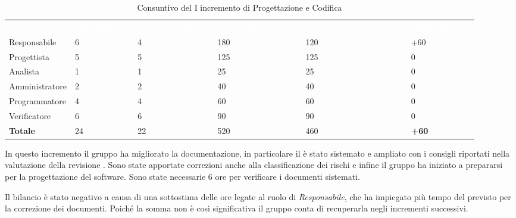 \begin{table}[H]
\begin{center}
\renewcommand{\arraystretch}{1.5}
\begin{tabular}{ m{}<{\centering}  m{}<{\centering} m{}<{\centering} m{}<{\centering} m{}<{\centering} m{}<{\centering}}	\rowcolor{darkblue}
	\textcolor{white}{\textbf{Ruolo}} & \textcolor{white}{\textbf{Ore Effettive}} & \textcolor{white}{\textbf{Ore Preventivate}}&\textcolor{white}{\textbf{Costo Effettivo (\euro)}}&\textcolor{white}{\textbf{Costo Preventivato (\euro)}}&\textcolor{white}{\textbf{Differenza (\euro)}}\\ 

	Responsabile  & 6 & 4 & 180 & 120 & +60\\	
	
	Progettista & 5 & 5 & 125 & 125 & 0\\
	
	Analista & 1 & 1 & 25 & 25 & 0\\
	
	Amministratore & 2 & 2 & 40 & 40 & 0\\
	
	Programmatore & 4 & 4 & 60 & 60 & 0\\
	
	Verificatore & 6 & 6 & 90 & 90 & 0\\
	
	\textbf{Totale} & 24 & 22 & 520 & 460 & \textbf{+60} \\
	
\end{tabular}
\caption{Consuntivo del I incremento di Progettazione e Codifica}
\end{center}
\end{table}

In questo incremento il gruppo ha migliorato la documentazione, in particolare il \PdP{} è stato sistemato e ampliato con i consigli riportati nella valutazione della revisione \RTB{}. Sono state apportate correzioni anche alla classificazione dei rischi e infine il gruppo ha iniziato a prepararsi per la progettazione del software.
Sono state necessarie 6 ore per verificare i documenti sistemati.

Il bilancio è stato negativo a causa di una sottostima delle ore legate al ruolo di \textit{Responsabile}, che ha impiegato più tempo del previsto per la correzione dei documenti. Poiché la somma non è così significativa il gruppo conta di recuperarla negli incrementi successivi.

